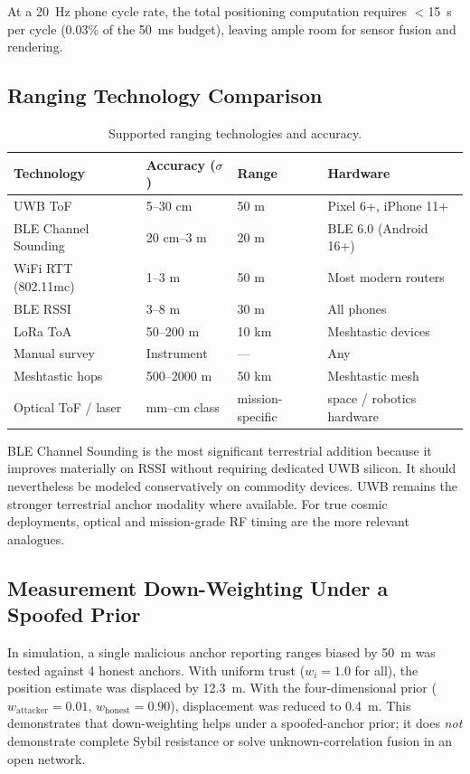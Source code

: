 \documentclass[12pt,a4paper]{article}
\begin{document}
At a 20~Hz phone cycle rate, the total positioning computation requires $<$15~\textmu s per cycle (0.03\% of the 50~ms budget), leaving ample room for sensor fusion and rendering.

\subsection{Ranging Technology Comparison}

\begin{table}[h]
\centering
\caption{Supported ranging technologies and accuracy.}
\label{tab:ranging}
\begin{tabular}{@{}llll@{}}
\toprule
\textbf{Technology} & \textbf{Accuracy ($\sigma$)} & \textbf{Range} & \textbf{Hardware} \\
\midrule
UWB ToF              & 5--30 cm      & 50 m   & Pixel 6+, iPhone 11+ \\
BLE Channel Sounding & 20 cm--3 m    & 20 m   & BLE 6.0 (Android 16+) \\
WiFi RTT (802.11mc)  & 1--3 m        & 50 m   & Most modern routers \\
BLE RSSI             & 3--8 m        & 30 m   & All phones \\
LoRa ToA             & 50--200 m     & 10 km  & Meshtastic devices \\
Manual survey        & Instrument    & ---    & Any \\
Meshtastic hops      & 500--2000 m   & 50 km  & Meshtastic mesh \\
Optical ToF / laser  & mm--cm class  & mission-specific & space / robotics hardware \\
\bottomrule
\end{tabular}
\end{table}

BLE Channel Sounding is the most significant terrestrial addition because it improves materially on RSSI without requiring dedicated UWB silicon. It should nevertheless be modeled conservatively on commodity devices. UWB remains the stronger terrestrial anchor modality where available. For true cosmic deployments, optical and mission-grade RF timing are the more relevant analogues.

\subsection{Measurement Down-Weighting Under a Spoofed Prior}

In simulation, a single malicious anchor reporting ranges biased by 50~m was tested against 4 honest anchors. With uniform trust ($w_i = 1.0$ for all), the position estimate was displaced by 12.3~m. With the four-dimensional prior ($w_{\text{attacker}} = 0.01$, $w_{\text{honest}} = 0.90$), displacement was reduced to 0.4~m. This demonstrates that down-weighting helps under a spoofed-anchor prior; it does \emph{not} demonstrate complete Sybil resistance or solve unknown-correlation fusion in an open network.
\end{document}
